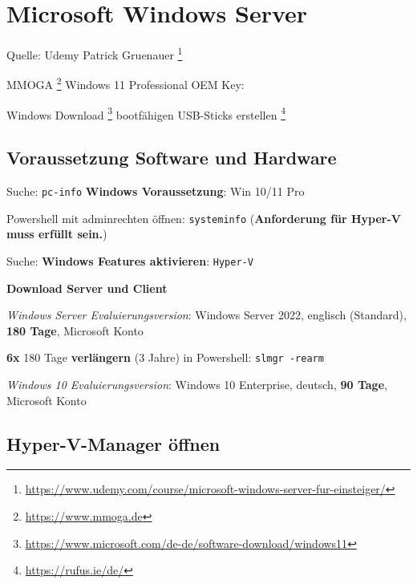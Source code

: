 \section{Microsoft Windows Server}\label{microsoft-windows-server}

Quelle: Udemy Patrick Gruenauer \footnote{\url{https://www.udemy.com/course/microsoft-windows-server-fur-einsteiger/}}

MMOGA \footnote{\url{https://www.mmoga.de}} Windows 11 Professional OEM
Key:

Windows Download \footnote{\url{https://www.microsoft.com/de-de/software-download/windows11}}
bootfähigen USB-Sticks erstellen \footnote{\url{https://rufus.ie/de/}}

\subsection{Voraussetzung Software und
Hardware}\label{voraussetzung-software-und-hardware}

Suche: \verb|pc-info| \textbf{Windows Voraussetzung}:
Win 10/11 Pro

Powershell mit adminrechten öffnen: \verb|systeminfo|
(\textbf{Anforderung für Hyper-V muss erfüllt sein.})

Suche: \textbf{Windows Features aktivieren}:
\verb|Hyper-V|

\textbf{Download Server und Client}

\emph{Windows Server Evaluierungsversion}: Windows Server 2022, englisch
(Standard), \textbf{180 Tage}, Microsoft Konto

\textbf{6x} 180 Tage \textbf{verlängern} (3 Jahre) in Powershell:
\verb|slmgr -rearm|

\emph{Windows 10 Evaluierungsversion}: Windows 10 Enterprise, deutsch,
\textbf{90 Tage}, Microsoft Konto

\subsection{Hyper-V-Manager öffnen}\label{hyper-v-manager-oeffnen}

